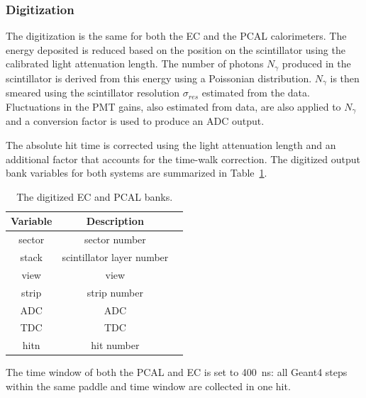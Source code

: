 \subsubsection{Digitization}

The digitization is the same for both the EC and the PCAL calorimeters. The energy deposited is reduced based on the
position on the scintillator using the calibrated light attenuation length. The number of photons $N_\gamma$ produced
in the scintillator is derived from this energy using a Poissonian distribution. $N_\gamma$ is then smeared using the
scintillator resolution $\sigma_{res}$ estimated from the data. Fluctuations in the PMT gains, also estimated from data,
are also applied to $N_\gamma$ and a conversion factor is used to produce an ADC output.

The absolute hit time is corrected using the light attenuation length and an additional factor that accounts for the
time-walk correction. The digitized output bank variables for both systems are summarized in Table~\ref{tab:ecBank}.

\begin{table}[h]
	\begin{center}
		\begin{tabular}{| c | c | c |}
			\hline \hline
			Variable &                Description   \\
			\hline
             sector  &              sector number   \\
              stack  &  scintillator layer number   \\
               view  &                       view   \\
              strip  &               strip number   \\
                ADC  &                        ADC   \\
                TDC  &                        TDC   \\
               hitn  &                 hit number   \\
			\hline \hline
		\end{tabular}
	\end{center}
	\caption{The digitized EC and PCAL banks.}
        \label{tab:ecBank}
\end{table}

The time window of both the PCAL and EC is set to 400~ns: all Geant4 steps within the same paddle
and time window are collected in one hit.
